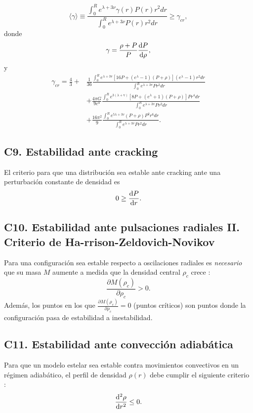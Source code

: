 \begin{equation}
    \langle\gamma\rangle\equiv\frac{\int_{0}^{R} e^{\lambda+3 \nu} \gamma(r) P(r) r^{2} d r}{\int_{0}^{R} e^{\lambda+3 \nu} P(r) r^{2} d r} \geq \gamma_{cr},
\end{equation}
donde 
\begin{equation}
    \gamma = \frac { \rho + P  } { P } \dv{P}{\rho},
\end{equation}
y 
\begin{align}\label{gammacrit}
    \gamma_{cr} = \frac{4}{3} +& \frac{1}{36} \frac{\int_{0}^{R} e^{\lambda+3 \mathrm{v}}\left[16 P+\left(e^{\lambda}-1\right)\left(P+\rho \right)\right]\left(e^{\lambda}-1\right) r^{2} d r}{\int_{0}^{R} e^{\lambda+3 \mathrm{v}} P r^{2} d r} \nonumber
    \\ &+ \frac{4 \pi G}{9 c^{4}} \frac{\int_{0}^{R} e^{3( \lambda+ \mathrm{v})}\left[8 P+\left(e^{\lambda}+1\right)\left(P+\rho \right)\right] P r^{4} d r}{\int_{0}^{R} e^{\lambda+3 \mathrm{v}} P r^{2} d r}
    \\ & + \frac{16 \pi^{2} }{9} \frac{\int_{0}^{R} e^{5 \lambda+3 v }\left(P+\rho \right) P^{2} r^{6} d r}{\int_{0}^{R} e^{\lambda+3 v } P r^{2} d r}. \nonumber
\end{align}
\subsection*{C9. Estabilidad ante cracking}
\noindent El criterio para que una distribución sea estable ante cracking ante una perturbación constante de densidad es \cite{Abreu2007}
\begin{equation}
    0 \geq \dv{P}{r}.
\end{equation}

\subsection*{C10. Estabilidad ante pulsaciones radiales II. Criterio de Ha-rrison-Zeldovich-Novikov}
\noindent Para una configuración sea estable respecto a oscilaciones radiales es \emph{necesario} que su masa $M$ aumente a medida que la densidad central $\rho_{c}$ crece \cite{Harrison1965,Zeldovich1971}: 
\begin{equation}
    \frac { \partial M \left( \rho _ { c } \right) } { \partial \rho _ { c } } > 0.
\end{equation}
Además, los puntos en los que $\frac { \partial M \left( \rho _ { c } \right) } { \partial \rho _ { c } } = 0$ (puntos críticos) son puntos donde la configuración pasa de estabilidad a inestabilidad.



\subsection*{C11. Estabilidad ante convección adiabática}

\noindent Para que un modelo estelar sea estable contra movimientos convectivos en un régimen adiabático, el perfil de densidad $\rho(r)$ debe cumplir el siguiente criterio \cite{Hernandez2018}: 
\begin{equation}
    \dv[2]{\rho}{r} \leq 0.
\end{equation}
